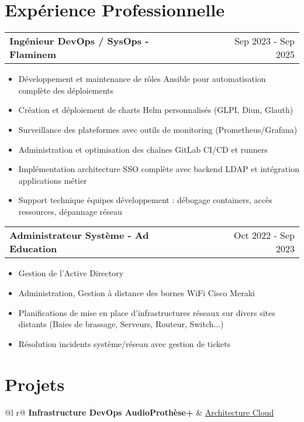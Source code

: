 \documentclass[a4paper,11pt]{article}
\makeatletter
\newenvironment{joblong}[2]
    {
    \begin{tabularx}{\linewidth}{@{}l X r@{}}
    \textbf{#1} & \hfill &  #2 \\[3.75pt]
    \end{tabularx}
    \begin{minipage}[t]{\linewidth}
    \begin{itemize}[nosep,after=\strut, leftmargin=1em, itemsep=3pt,label=--]
    }
    {
    \end{itemize}
    \end{minipage}    
    }
\makeatother
\begin{document}
\section{Expérience Professionnelle}

\begin{joblong}{Ingénieur DevOps / SysOps - Flaminem}{Sep 2023 - Sep 2025}
\item Développement et maintenance de rôles Ansible pour automatisation complète des déploiements
\item Création et déploiement de charts Helm personnalisés (GLPI, Diun, Glauth)
\item Surveillance des plateformes avec outils de monitoring (Prometheus/Grafana)
\item Administration et optimisation des chaînes GitLab CI/CD et runners
\item Implémentation architecture SSO complète avec backend LDAP et intégration applications métier
\item Support technique équipes développement : débogage containers, accès ressources, dépannage réseau
\end{joblong}

\begin{joblong}{Administrateur Système - Ad Education}{Oct 2022 - Sep 2023}
\item Gestion de l'Active Directory
\item Administration, Gestion à distance des bornes WiFi Cisco Meraki
\item Planifications de mise en place d'infrastructures réseaux sur divers sites distants (Baies de brassage, Serveurs, Routeur, Switch...)
\item Résolution incidents système/réseau avec gestion de tickets
\end{joblong}
  
\section{Projets}

\begin{tabularx}{\linewidth}{ @{}l r@{} }
\textbf{Infrastructure DevOps AudioProthèse+} & \hfill \href{https://portfolio.alaincheng.com/projects/audioprothese-plus.html}{Architecture Cloud} \\[2pt]
  \\
\end{tabularx}
\end{document}

